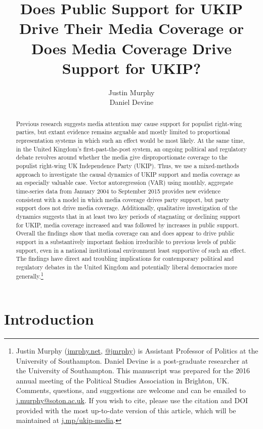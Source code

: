 \documentclass[12pt,article]{article}
\title{Does Public Support for UKIP Drive Their Media Coverage or Does Media
Coverage Drive Support for UKIP?}
\author{Justin Murphy \\ Daniel Devine}
\date{}
\let\rmarkdownfootnote\footnote%
\def\footnote{\protect\rmarkdownfootnote}
\begin{document}
\maketitle


\begin{abstract}
Previous research suggests media attention may cause support for populist right-wing parties, but extant evidence remains arguable and mostly limited to proportional representation systems in which such an effect would be most likely. At the same time, in the United Kingdom's first-past-the-post system, an ongoing political and regulatory debate revolves around whether the media give disproportionate coverage to the populist right-wing UK Independence Party (UKIP). Thus, we use a mixed-methods approach to investigate the causal dynamics of UKIP support and media coverage as an especially valuable case. Vector autoregression (VAR) using monthly, aggregate time-series data from January 2004 to September 2015 provides new evidence consistent with a model in which media coverage drives party support, but party support does not drive media coverage. Additionally, qualitative investigation of the dynamics suggests that in at least two key periods of stagnating or declining support for UKIP, media coverage increased and was followed by increases in public support. Overall the findings show that media coverage can and does appear to drive public support in a substantively important fashion irreducible to previous levels of public support, even in a national institutional environment least supportive of such an effect. The findings have direct and troubling implications for contemporary political and regulatory debates in the United Kingdom and potentially liberal democracies more generally.\footnote{Justin Murphy (\href{http://jmrphy.net}{jmrphy.net}, \href{http://twitter.com/jmrphy}{@jmrphy}) is Assistant Professor of Politics at the University of Southampton. Daniel Devine is a post-graduate researcher at the University of Southampton. This manuscript was prepared for the 2016 annual meeting of the Political Studies Association in Brighton, UK. Comments, questions, and suggestions are welcome and can be emailed to \href{mailto:j.murphy@soton.ac.uk}{j.murphy@soton.ac.uk}. If you wish to cite, please use the citation and DOI provided with the most up-to-date version of this article, which will be maintained at \href{http://j.mp/ukip-media}{j.mp/ukip-media}.}
\end{abstract}
\doublespacing
\setlength\parindent{24pt}

\section{Introduction}\label{introduction}
\end{document}
